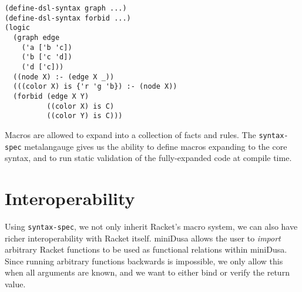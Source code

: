 \documentclass[dvipsnames,sigplan,screen,review,anonymous,acmthm,nonacm]{acmart}
\begin{document}
\begin{verbatim}
(define-dsl-syntax graph ...)
(define-dsl-syntax forbid ...)
(logic
  (graph edge
    ('a ['b 'c])
    ('b ['c 'd])
    ('d ['c]))
  ((node X) :- (edge X _))
  (((color X) is {'r 'g 'b}) :- (node X))
  (forbid (edge X Y)
          ((color X) is C)
          ((color Y) is C)))
\end{verbatim}

Macros are allowed to expand into a collection of facts and rules. The
\texttt{syntax-spec} metalangauge gives us the ability to define macros
expanding to the core syntax, and to run static validation of the fully-expanded
code at compile time. 


\begin{center}
\end{center}

\section{Interoperability}

Using \texttt{syntax-spec}, we not only inherit Racket's macro system, we can
also have richer interoperability with Racket itself. miniDusa allows the user
to \emph{import} arbitrary Racket functions to be used as functional relations
within miniDusa. Since running arbitrary functions backwards is impossible, we
only allow this when all arguments are known, and we want to either bind or
verify the return value.
\end{document}
